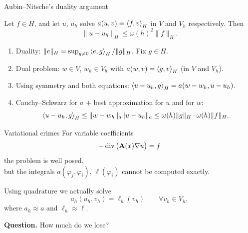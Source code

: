 \begin{frame}{Aubin--Nitsche's duality argument}
    \begin{lemma}
        Let $f \in H$, and let $u$, $u_h$ solve $a(u,v) = \left\langle f, v \right\rangle_H$ in $V$ and $V_h$ respectively. Then
        \[
            \|u - u_h\|_H \le \omega(h)^2 \|f\|_H .
        \]
    \end{lemma}
    \begin{proofsteps}
        \begin{enumerate}
            \item Duality: $\|e\|_H = \sup_{g \ne 0} \left\langle e, g \right\rangle_H/\|g\|_H$. Fix $g \in H$.
            \item Dual problem: $w \in V$, $w_h \in V_h$ with $a(w, v) = \left\langle g, v \right\rangle_H$ (in $V$ and $V_h$).
            \item Using symmetry and both equations: $\left\langle u - u_h, g \right\rangle_H = a(w - w_h, u - u_h)$.
            \item Cauchy--Schwarz for $a$ $+$ best approximation for $u$ and for $w$:
                  \[
                      \left\langle u - u_h, g \right\rangle_H \le \|w - w_h\|_a \|u - u_h\|_a \le \omega(h)\|g\|_H \cdot \omega(h) \|f\|_H.
                  \]
        \end{enumerate}
    \end{proofsteps}
\end{frame}

\begin{frame}{Variational crimes}
    For variable coefficients
    \[
        -\operatorname{div}\big(\mathbf{A}(x) \nabla u\big) = f
    \]
    the problem is well posed,\\ but the integrals $a(\varphi_j, \varphi_i)$, $\ell(\varphi_i)$ cannot be computed exactly.
    \medskip

    Using \alert{quadrature} we actually solve
    \[
        a_h(u_h, v_h) = \ell_h(v_h) \qquad \forall v_h \in V_h,
    \]
    where $a_h \approx a$ and $\ell_h \approx \ell$.
    \bigskip

    \textbf{Question.} How much do we lose?
\end{frame}

